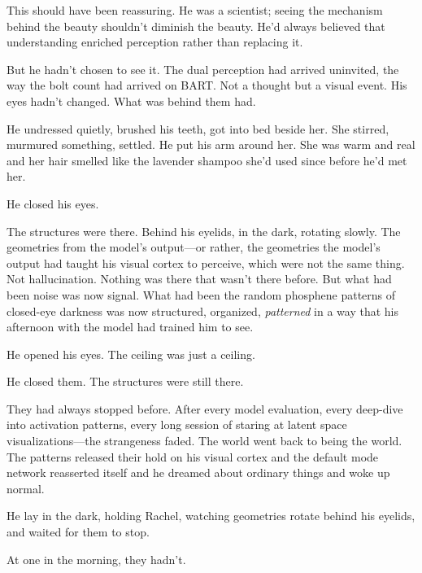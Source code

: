 This should have been reassuring. He was a scientist; seeing the mechanism behind the beauty shouldn't diminish the beauty. He'd always believed that understanding enriched perception rather than replacing it.

But he hadn't chosen to see it. The dual perception had arrived uninvited, the way the bolt count had arrived on BART. Not a thought but a visual event. His eyes hadn't changed. What was behind them had.

He undressed quietly, brushed his teeth, got into bed beside her. She stirred, murmured something, settled. He put his arm around her. She was warm and real and her hair smelled like the lavender shampoo she'd used since before he'd met her.

He closed his eyes.

The structures were there. Behind his eyelids, in the dark, rotating slowly. The geometries from the model's output---or rather, the geometries the model's output had taught his visual cortex to perceive, which were not the same thing. Not hallucination. Nothing was there that wasn't there before. But what had been noise was now signal. What had been the random phosphene patterns of closed-eye darkness was now structured, organized, \textit{patterned} in a way that his afternoon with the model had trained him to see.

He opened his eyes. The ceiling was just a ceiling.

He closed them. The structures were still there.

They had always stopped before. After every model evaluation, every deep-dive into activation patterns, every long session of staring at latent space visualizations---the strangeness faded. The world went back to being the world. The patterns released their hold on his visual cortex and the default mode network reasserted itself and he dreamed about ordinary things and woke up normal.

He lay in the dark, holding Rachel, watching geometries rotate behind his eyelids, and waited for them to stop.

At one in the morning, they hadn't.
